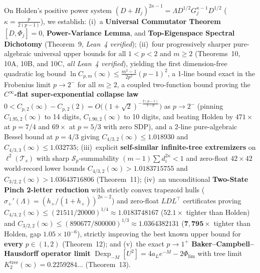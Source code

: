 \documentclass[10pt,letterpaper]{article}
\newcommand{\Sp}{\mathcal{S}_p}
\begin{document}
\begin{tcolorbox}[abstractbox]
{On Holden's positive power system $(D + H_j)^{2\kappa-1} = \Lambda D^{1/2} G_j^{\kappa-1} D^{1/2}$ ($\kappa = \frac{p}{2(p-1)}$), we establish: (i)~a \textbf{Universal Commutator Theorem} $[D, \Phi_j] = 0$, \textbf{Power-Variance Lemma}, and \textbf{Top-Eigenspace Spectral Dichotomy} (Theorem~9, \emph{Lean~4 verified}); (ii)~four progressively sharper pure-algebraic universal upper bounds for all $1<p<2$ and $m\ge 2$ (Theorems~10, 10A, 10B, and 10C, \emph{all Lean~4 verified}), yielding the first dimension-free quadratic log bound $\ln C_{p,m}(\infty) \le \frac{m^2-1}{2p^2}(p-1)^2$, a 1-line bound exact in the Frobenius limit $p \to 2^-$ for all $m \ge 2$, a coupled two-function bound proving the \textbf{$C^\infty$-flat super-exponential collapse law} $0 < C_{p,2}(\infty) - C_{p,2}(2) = O\bigl((1+\sqrt{2})^{-\frac{2(p-1)}{2-p}}\bigr)$ as $p \to 2^-$ (pinning $C_{1.95,2}(\infty)$ to 14 digits, $C_{1.90,2}(\infty)$ to 10 digits, and beating Holden by $471\times$ at $p = 7/4$ and $69\times$ at $p = 5/3$ with zero SDP), and a 2-line pure-algebraic Bessel bound at $p = 4/3$ giving $C_{4/3,2}(\infty) \le 1.018930$ and $C_{4/3,3}(\infty) \le 1.032735$; (iii)~explicit \textbf{self-similar infinite-tree extremizers} on $\ell^2(\mathcal{T}_s)$ with sharp $\Sp$-summability $(m-1)\sum d_i^{2\kappa} < 1$ and zero-float $42\times 42$ world-record lower bounds $C_{4/3,2}(\infty) > 1.0183715755$ and $C_{3/2,2}(\infty) > 1.03643716806$ (Theorem~11); (iv)~an unconditional \textbf{Two-State Pinch 2-letter reduction} with strictly convex trapezoid hulls ($\sigma_+'(\Lambda) = (h_+/(1+h_+))^{2\kappa-2}$) and zero-float $LDL^\top$ certificates proving $C_{4/3,2}(\infty) \le (21511/20000)^{1/4} \approx 1.0183748167$ ($\mathbf{52.1\times}$ tighter than Holden) and $C_{3/2,2}(\infty) \le (890677/800000)^{1/3} \approx 1.0364382131$ ($\mathbf{7{,}795\times}$ tighter than Holden, gap $1.05\times 10^{-6}$), strictly improving the best known upper bound for \textbf{every} $p \in (1, 2)$ (Theorem~12); and (v)~the exact \textbf{$p \to 1^+$ Baker--Campbell--Hausdorff operator limit} $\operatorname{Dexp}_{-M}[U^2] = 4a_L e^{-M} - 2\Phi_{\lim}$ with tree limit $K_2^{\mathrm{tree}}(\infty) = 0.2259284\dots$ (Theorem~13).}
\end{tcolorbox}
\end{document}
